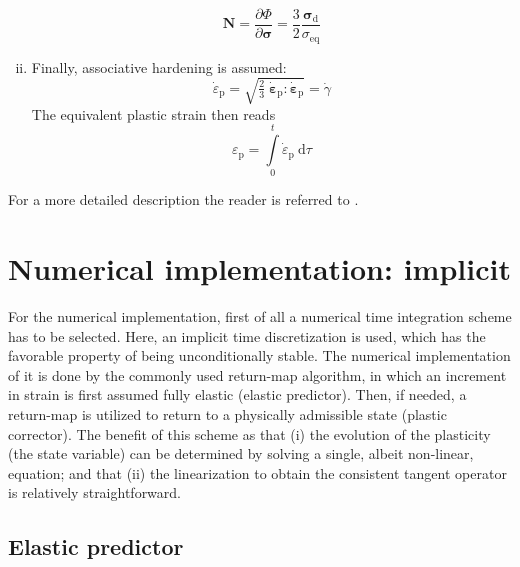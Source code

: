 \documentclass[times,namecite]{goose-article}
\begin{document}
\begin{enumerate}[(i)]
\begin{equation}
  \bm{N}
  = \frac{\partial \Phi}{\partial \bm{\sigma}}
  = \frac{3}{2}
    \frac{\bm{\sigma}_\mathrm{d}}{\sigma_\mathrm{eq}}
\end{equation}
%
\item Finally, associative hardening is assumed:
\begin{equation}
  \dot{\varepsilon}_\mathrm{p}
  = \sqrt{\tfrac{2}{3} \; \dot{\bm{\varepsilon}}_\mathrm{p} : \dot{\bm{\varepsilon}}_\mathrm{p}}
  = \dot{\gamma}
\end{equation}
The equivalent plastic strain then reads
\begin{equation}
  \varepsilon_\mathrm{p} =
  \int\limits_0^t \dot{\varepsilon}_\mathrm{p} ~\mathrm{d}\tau
\end{equation}
%
\end{enumerate}
%
For a more detailed description the reader is referred to \citet[][p.\ 216-234]{DeSouzaNeto2008}.

\vfill\newpage
\section{Numerical implementation: implicit}

For the numerical implementation, first of all a numerical time integration scheme has to be selected. Here, an implicit time discretization is used, which has the favorable property of being unconditionally stable. The numerical implementation of it is done by the commonly used return-map algorithm, in which an increment in strain is first assumed fully elastic (elastic predictor). Then, if needed, a return-map is utilized to return to a physically admissible state (plastic corrector). The benefit of this scheme as that (i) the evolution of the plasticity (the state variable) can be determined by solving a single, albeit non-linear, equation; and that (ii) the linearization to obtain the consistent tangent operator is relatively straightforward.

\subsection{Elastic predictor}
\end{document}
